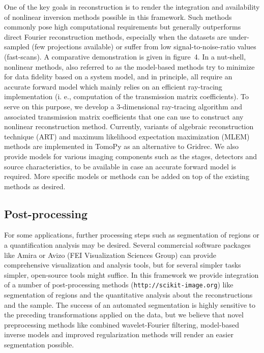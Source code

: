 \documentclass[pdf]{iucr}              %
\begin{document}
One of the key goals in reconstruction is to render the integration and availability of nonlinear inversion methods possible in this framework. Such methods commonly pose high computational requirements but generally outperforms direct Fourier reconstruction methods, especially when the datasets are under-sampled (few projections available) or suffer from low signal-to-noise-ratio values (fast-scans). A comparative demonstration is given in figure~4. In a nut-shell, nonlinear methods, also referred to as the model-based methods try to minimize for data fidelity based on a system model, and in principle, all require an accurate forward model which mainly relies on an efficient ray-tracing implementation (i. e., computation of the transmission matrix coefficients). To serve on this purpose, we develop a 3-dimensional ray-tracing algorithm and associated transmission matrix coefficients that one can use to construct any nonlinear reconstruction method. Currently, variants of algebraic reconstruction technique (ART) \cite{Gordon1970}  and maximum likelihood expectation maximization (MLEM) \cite{Dempster1977} methods are implemented in TomoPy as an alternative to Gridrec. We also provide models for various imaging components such as the stages, detectors and source characteristics, to be available in case an accurate forward model is required. More specific models or methods can be added on top of the existing methods as desired.

\subsection{Post-processing}

For some applications, further processing steps such as segmentation of regions or a quantification analysis may be desired. Several commercial software packages like Amira or Avizo (FEI Visualization Sciences Group) can provide comprehensive visualization and analysis tools, but for several simpler tasks simpler, open-source tools might suffice. In this framework we provide integration of a number of post-processing methods (\texttt{http://scikit-image.org}) like segmentation of regions and the quantitative analysis about the reconstructions and the sample. The success of an automated segmentation is highly sensitive to the preceding transformations applied on the data, but we believe that novel preprocessing methods like combined wavelet-Fourier filtering, model-based inverse models and improved regularization methods will render an easier segmentation possible. 
\end{document}
